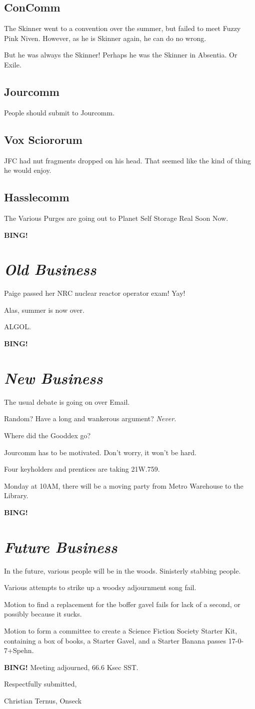 \documentclass[10pt]{article}
\newcommand{\bing}{{\bf BING!} }
\newcommand{\goto}[1]{\bing \vskip 12pt \section*{{\em{#1}}}}
\begin{document}
\subsection*{ConComm}

The Skinner went to a convention over the summer, but failed to meet Fuzzy Pink Niven.  However, as he is 
Skinner again, he can do no wrong.

But he was always the Skinner!  Perhaps he was the Skinner in Absentia.  Or Exile.

\subsection*{Jourcomm}

People should submit to Jourcomm.

\subsection*{Vox Sciororum}

JFC had nut fragments dropped on his head.  That seemed like the kind of thing he would enjoy.

\subsection*{Hasslecomm}

The Various Purges are going out to Planet Self Storage Real Soon Now.

\goto{Old Business}

Paige passed her NRC nuclear reactor operator exam!  Yay!

Alas, summer is now over.

ALGOL.

\goto{New Business}

The usual debate is going on over Email.

Random?  Have a long and wankerous argument?  \emph{Never.}

Where did the Gooddex go?

Jourcomm has to be motivated.  Don't worry, it won't be hard.

Four keyholders and prentices are taking 21W.759.

Monday at 10AM, there will be a moving party from Metro Warehouse to the Library.

\goto{Future Business}

In the future, various people will be in the woods.  Sinisterly stabbing people.

Various attempts to strike up a woodsy adjournment song fail.

Motion to find a replacement for the boffer gavel fails for lack of a second, or possibly because it sucks.

Motion to form a committee to create a Science Fiction Society Starter Kit, containing a box of books, a Starter Gavel, and a Starter Banana passes 17-0-7+Spehn.

\bing
\noindent
Meeting adjourned, 66.6 Ksec SST.

\vspace{18pt}

\centerline{Respectfully submitted,}
\centerline{Christian Ternus, Onseck}
\end{document}
